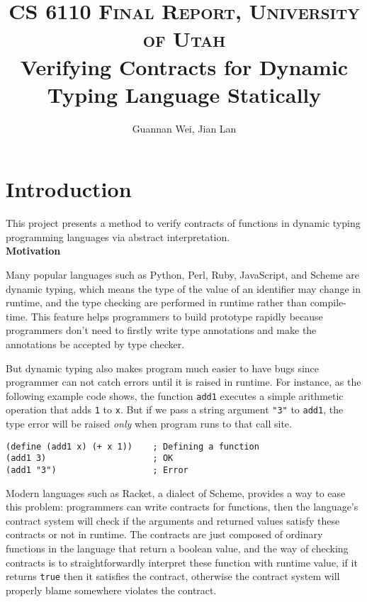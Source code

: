 \documentclass[paper=a4, fontsize=11pt]{scrartcl} %
\title{	
\normalfont \normalsize 
\textsc{CS 6110 Final Report, University of Utah} \\ [25pt] %
\huge Verifying Contracts for Dynamic Typing Language Statically \\ %
}
\author{Guannan Wei, Jian Lan} %
\numberwithin{equation}{section} %
\numberwithin{figure}{section} %
\numberwithin{table}{section} %
\begin{document}
\maketitle %

\section{Introduction}

This project presents a method to verify contracts of functions in dynamic typing programming languages via abstract interpretation. \\

\textbf{Motivation}

Many popular languages such as Python, Perl, Ruby, JavaScript, and Scheme are dynamic typing, which means the type of the value of an identifier may change in runtime, and the type checking are performed in runtime rather than compile-time. This feature helps programmers to build prototype rapidly because programmers don't need to firstly write type annotations and make the annotations be accepted by type checker.

But dynamic typing also makes program much easier to have bugs since programmer can not catch errors until it is raised in runtime. For instance, as the following example code shows, the function \texttt{add1} executes a simple arithmetic operation that adds \texttt{1} to \texttt{x}. But if we pass a string argument \texttt{"3"} to \texttt{add1}, the type error will be raised \textit{only} when program runs to that call site.

\begin{verbatim}
(define (add1 x) (+ x 1))    ; Defining a function
(add1 3)                     ; OK
(add1 "3")                   ; Error
\end{verbatim}

Modern languages such as Racket, a dialect of Scheme, provides a way to ease this problem: programmers can write contracts for functions, then the language's contract system will check if the arguments and returned values satisfy these contracts or not in runtime. The contracts are just composed of ordinary functions in the language that return a boolean value, and the way of checking contracts is to straightforwardly interpret these function with runtime value, if it returns \texttt{true} then it satisfies the contract, otherwise the contract system will properly blame somewhere violates the contract.
\end{document}
